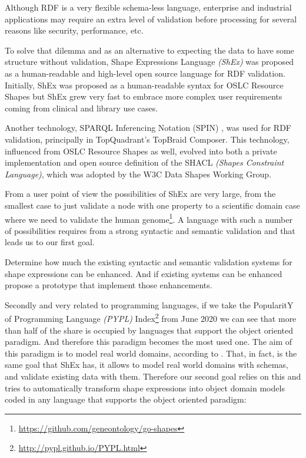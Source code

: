 Although RDF is a very flexible schema-less language, enterprise and industrial applications may require an extra level of
validation before processing for several reasons like security, performance, etc.

To solve that dilemma and as an alternative to expecting the data to have some structure without validation, Shape Expressions Language
\textit{(ShEx)} was proposed as a human-readable and high-level open source language for RDF validation. Initially, ShEx was proposed
as a human-readable syntax for OSLC Resource Shapes \cite{oslc-resource-shape} but ShEx grew very fast to embrace more
complex user requirements coming from clinical and library use cases.

Another technology, SPARQL Inferencing Notation (SPIN) \cite{knublauch2011spin}, was used for RDF validation, principally in TopQuadrant’s TopBraid Composer. This technology, influenced
from OSLC Resource Shapes as well, evolved into both a private implementation and open source definition of the SHACL
\textit{(Shapes Constraint Language)}, which was adopted by the W3C Data Shapes Working Group.

From a user point of view the possibilities of ShEx are very large, from the smallest case to just validate a node with one property
to a scientific domain case where we need to validate the human genome\footnote{\url{https://github.com/geneontology/go-shapes}}. A language with such a number
of possibilities requires from a strong syntactic and semantic validation and that leads us to our first goal.

\begin{researchquestion}
  Determine how much the existing syntactic and semantic validation systems for shape expressions can be enhanced. And
  if existing systems can be enhanced propose a prototype that implement those enhancements.
\end{researchquestion}

Secondly and very related to programming languages, if we take the PopularitY of Programming Language \textit{(PYPL)} Index\footnote{\url{http://pypl.github.io/PYPL.html}}
from June 2020 we can see that more than half of the share is occupied by languages that support the object oriented paradigm. And therefore this paradigm
becomes the most used one. The aim of this paradigm is to model real world domains, according to \cite{wegner1990concepts}. That, in fact, is the same goal
that ShEx has, it allows to model real world domains with schemas, and validate existing data with them. Therefore our second goal relies on this and tries
to automatically transform shape expressions into object domain models coded in any language that supports the object oriented paradigm:

